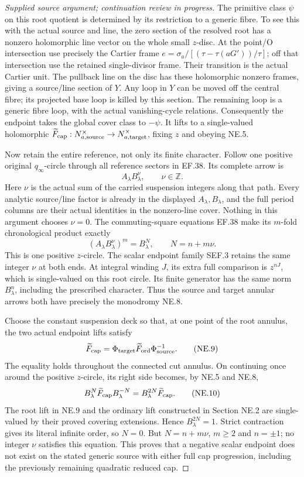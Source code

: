 \begin{proof}[Supplied source argument; continuation review in progress]
The primitive class \(\psi\) on this root quotient is determined
by its restriction to a generic fibre. To see this with the actual
source and line, the zero section of the resolved root has a
nonzero holomorphic line vector on the whole small \(z\)-disc.
At the point/O intersection use precisely the Cartier frame
\(e=\sigma_a/[(\tau-\tau(aG'))/\tau]\); off that intersection
use the retained single-divisor frame. Their transition is the
actual Cartier unit. The pullback line on the disc has these
holomorphic nonzero frames, giving a source/line section of \(Y\).
Any loop in \(Y\) can be moved off the central fibre; its projected
base loop is killed by this section. The remaining loop is a
generic fibre loop, with the actual vanishing-cycle relations.
Consequently the endpoint takes the global cover class to
\(-\psi\). It lifts to a single-valued holomorphic
\(\widetilde F_{\rm cap}:N_{a,\rm source}^\times\to
N_{a,\rm target}^\times\), fixing \(z\) and obeying NE.5.

Now retain the entire reference, not only its finite character.
Follow one positive original \(q_\infty\)-circle through all
reference sectors in EF.38. Its complete arrow is
\[
                     A_\lambda B_\lambda^\nu,
                     \qquad \nu\in\mathbb Z.
 \tag{NE.7}
\]
Here \(\nu\) is the actual sum of the carried suspension integers
along that path. Every analytic source/line factor is already in
the displayed \(A_\lambda,B_\lambda\), and the full period columns
are their actual identities in the nonzero-line cover. Nothing in
this argument chooses \(\nu=0\). The commuting-square equations
EF.38 make its \(m\)-fold chronological product exactly
\[
 (A_\lambda B_\lambda^\nu)^m
       =B_\lambda^{N},\qquad N=n+m\nu.
 \tag{NE.8}
\]
This is one positive \(z\)-circle. The scalar endpoint family
SEF.3 retains the same integer \(\nu\) at both ends. At integral
winding \(J\), its extra full comparison is \(z^{nJ}\), which
is single-valued on this root circle. Its finite generator has the
same norm \(B_\lambda^n\), including the prescribed character.
Thus the source and target annular arrows both have precisely the
monodromy NE.8.

Choose the constant suspension deck so that, at one point of the
root annulus, the two actual endpoint lifts satisfy
\[
 \widetilde F_{\rm cap}
     =\Phi_{\rm target}\widetilde F_{\rm ord}
                         \Phi_{\rm source}^{-1}.
 \tag{NE.9}
\]
The equality holds throughout the connected cut annulus. On
continuing once around the positive \(z\)-circle, its right side
becomes, by NE.5 and NE.8,
\[
 B_\lambda^N\widetilde F_{\rm cap}B_\lambda^{-N}
                  =B_\lambda^{2N}\widetilde F_{\rm cap}.
 \tag{NE.10}
\]
The root lift in NE.9 and the ordinary lift constructed in
Section NE.2 are single-valued by their proved covering extensions. Hence
\(B_\lambda^{2N}=1\). Strict contraction gives its literal infinite
order, so \(N=0\). But \(N=n+m\nu\), \(m\ge2\) and
\(n=\pm1\); no integer \(\nu\) satisfies this equation.
This proves that a negative scalar endpoint does not exist on
the stated generic source with either full cap progression,
including the previously remaining quadratic reduced cap.


\end{proof}

